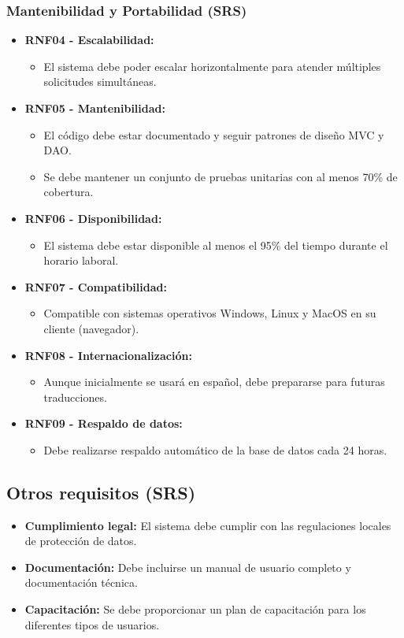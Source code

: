 \subsubsection{Mantenibilidad y Portabilidad (SRS)}
\begin{itemize}
\item \textbf{RNF04 - Escalabilidad:}
  \begin{itemize}
  \item El sistema debe poder escalar horizontalmente para atender múltiples solicitudes simultáneas.
  \end{itemize}
\item \textbf{RNF05 - Mantenibilidad:}
  \begin{itemize}
  \item El código debe estar documentado y seguir patrones de diseño MVC y DAO.
  \item Se debe mantener un conjunto de pruebas unitarias con al menos 70\% de cobertura.
  \end{itemize}
\item \textbf{RNF06 - Disponibilidad:}
  \begin{itemize}
  \item El sistema debe estar disponible al menos el 95\% del tiempo durante el horario laboral.
  \end{itemize}
\item \textbf{RNF07 - Compatibilidad:}
  \begin{itemize}
  \item Compatible con sistemas operativos Windows, Linux y MacOS en su cliente (navegador).
  \end{itemize}
\item \textbf{RNF08 - Internacionalización:}
  \begin{itemize}
  \item Aunque inicialmente se usará en español, debe prepararse para futuras traducciones.
  \end{itemize}
\item \textbf{RNF09 - Respaldo de datos:}
  \begin{itemize}
  \item Debe realizarse respaldo automático de la base de datos cada 24 horas.
  \end{itemize}
\end{itemize}

\subsection{Otros requisitos (SRS)}
\label{srs:otros}
\begin{itemize}
\item \textbf{Cumplimiento legal:} El sistema debe cumplir con las regulaciones locales de protección de datos.
\item \textbf{Documentación:} Debe incluirse un manual de usuario completo y documentación técnica.
\item \textbf{Capacitación:} Se debe proporcionar un plan de capacitación para los diferentes tipos de usuarios.
\end{itemize}

